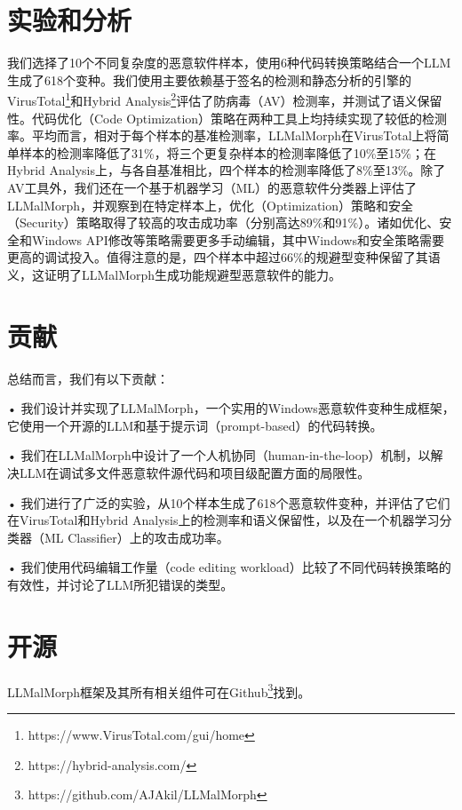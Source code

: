\section{实验和分析}
我们选择了10个不同复杂度的恶意软件样本，使用6种代码转换策略结合一个LLM生成了618个变种。我们使用主要依赖基于签名的检测和静态分析的引擎的VirusTotal\footnote{https://www.VirusTotal.com/gui/home}和Hybrid Analysis\footnote{https://hybrid-analysis.com/}评估了防病毒（AV）检测率，并测试了语义保留性。代码优化（Code Optimization）策略在两种工具上均持续实现了较低的检测率。平均而言，相对于每个样本的基准检测率，LLMalMorph在VirusTotal上将简单样本的检测率降低了31\%，将三个更复杂样本的检测率降低了10\%至15\%；在Hybrid Analysis上，与各自基准相比，四个样本的检测率降低了8\%至13\%。除了AV工具外，我们还在一个基于机器学习（ML）的恶意软件分类器上评估了LLMalMorph，并观察到在特定样本上，优化（Optimization）策略和安全（Security）策略取得了较高的攻击成功率（分别高达89\%和91\%）。诸如优化、安全和Windows API修改等策略需要更多手动编辑，其中Windows和安全策略需要更高的调试投入。值得注意的是，四个样本中超过66\%的规避型变种保留了其语义，这证明了LLMalMorph生成功能规避型恶意软件的能力。

\section{贡献}
总结而言，我们有以下贡献：

• 我们设计并实现了LLMalMorph，一个实用的Windows恶意软件变种生成框架，它使用一个开源的LLM和基于提示词（prompt-based）的代码转换。

• 我们在LLMalMorph中设计了一个人机协同（human-in-the-loop）机制，以解决LLM在调试多文件恶意软件源代码和项目级配置方面的局限性。

• 我们进行了广泛的实验，从10个样本生成了618个恶意软件变种，并评估了它们在VirusTotal和Hybrid Analysis上的检测率和语义保留性，以及在一个机器学习分类器（ML Classifier）上的攻击成功率。

• 我们使用代码编辑工作量（code editing workload）比较了不同代码转换策略的有效性，并讨论了LLM所犯错误的类型。

\section{开源}
LLMalMorph框架及其所有相关组件可在Github\footnote{https://github.com/AJAkil/LLMalMorph}找到。